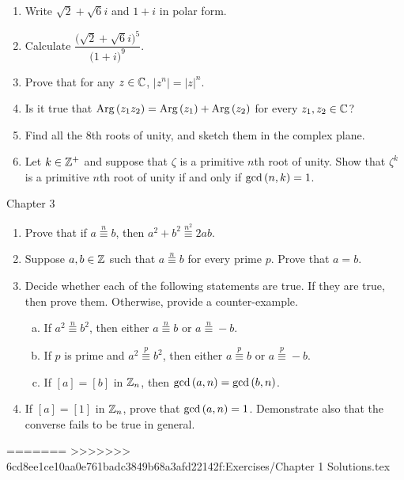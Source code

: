 \documentclass[11pt,fleqn,dvipsnames,usenames]{article}
\begin{document}
\begin{enumerate}
\item Write $\sqrt{2} + \sqrt{6}i$ and $1 + i$ in polar form.
\item Calculate $\dfrac{\big(\sqrt{2} + \sqrt{6}i\big)^5}{\big(1+i\big)^9}$.
\item Prove that for any $z\in\mathbb{C}$, $|z^{n}| = |z|^{n}$.
\item Is it true that $\text{Arg}\left(z_1z_2\right) = \text{Arg}\left(z_1\right) + \text{Arg}\left(z_2\right)$ for every $z_{1},z_{2}\in\mathbb{C}$?
\item Find all the $8$th roots of unity, and sketch them in the complex plane.
\item Let $k\in\mathbb{Z}^{+}$ and suppose that $\zeta$ is a primitive $n$th root of unity.  Show that $\zeta^{k}$ is a primitive $n$th root of unity if and only if $\text{gcd}\left(n,k\right) = 1$.
\end{enumerate}
\vsp

{\huge Chapter 3}
\vsp

\begin{enumerate}
\item Prove that if $a\overset{n}{\equiv}b$, then $a^2 + b^2\overset{n^2}{\equiv}2ab$.
\item Suppose $a,b\in\mathbb{Z}$ such that $a\overset{n}{\equiv}b$ for every prime $p$.  Prove that $a=b$.
\item Decide whether each of the following statements are true.  If they are true, then prove them.  Otherwise, provide a counter-example.
\begin{enumerate}[(a)]
\item If $a^2\overset{n}{\equiv}b^2$, then either $a\overset{n}{\equiv}b$ or $a\overset{n}{\equiv}-b$.
\item If $p$ is prime and $a^2\overset{p}{\equiv}b^2$, then either $a\overset{p}{\equiv}b$ or $a\overset{p}{\equiv}-b$.
\item If $[a] = [b]$ in $\mathbb{Z}_{n}$, then $\text{gcd}\left(a,n\right) = \text{gcd}\left(b,n\right)$.
\end{enumerate}
\item If $[a] = [1]$ in $\mathbb{Z}_{n}$, prove that $\text{gcd}\left(a,n\right) = 1$.  Demonstrate also that the converse fails to be true in general.
\end{enumerate}
=======
>>>>>>> 6cd8ee1ce10aa0e761badc3849b68a3afd22142f:Exercises/Chapter 1 Solutions.tex
\end{document}
